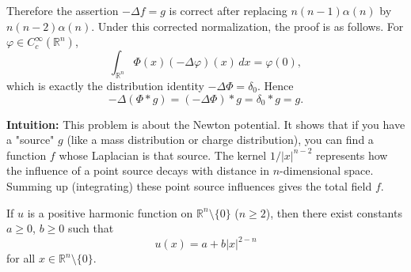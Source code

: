 \begin{solution}
\begin{enumerate}
    Therefore the assertion $-\Delta f=g$ is correct after replacing $n(n-1)\alpha(n)$ by $n(n-2)\alpha(n)$.  Under this corrected normalization, the proof is as follows.  For $\varphi\in C_c^\infty(\mathbb{R}^n)$,
    \[
    \int_{\mathbb{R}^n}\Phi(x)(-\Delta\varphi)(x)\,dx=\varphi(0),
    \]
    which is exactly the distribution identity $-\Delta\Phi=\delta_0$.  Hence
    \[
    -\Delta(\Phi*g)=(-\Delta\Phi)*g=\delta_0*g=g.
    \]
\end{enumerate}

\par\vspace{\baselineskip}
\textbf{Intuition:} 
This problem is about the Newton potential. It shows that if you have a "source" $g$ (like a mass distribution or charge distribution), you can find a function $f$ whose Laplacian is that source. The kernel $1/|x|^{n-2}$ represents how the influence of a point source decays with distance in $n$-dimensional space. Summing up (integrating) these point source influences gives the total field $f$.
\end{solution}

\begin{exercise}
\label{analysis:2018:6}
If $u$ is a positive harmonic function on $\mathbb{R}^n\setminus\{0\}$ ($n\geq 2$), then there exist constants $a \geq 0$, $b \geq 0$ such that 
\[
u(x) = a + b|x|^{2-n}
\]
for all $x \in \mathbb{R}^n\setminus\{0\}$.
\end{exercise}

